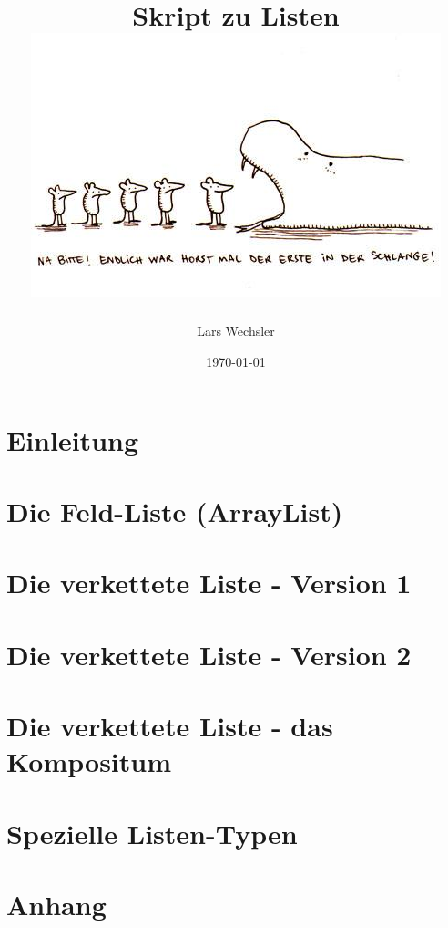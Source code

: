 \documentclass{article}
\author{Lars Wechsler}
\title{Skript zu Listen \\ \centering\includegraphics[scale=0.80]{media/title.jpg}}
\date{\today}
\begin{document}
\maketitle
\newpage 

\tableofcontents
\section{Einleitung}



\newpage

\section{Die Feld-Liste (ArrayList)}



\newpage



\newpage

\section{Die verkettete Liste - Version 1}





\newpage

\section{Die verkettete Liste - Version 2}



\newpage

\section{Die verkettete Liste - das Kompositum}





\newpage

\section{Spezielle Listen-Typen}



\newpage

\section{Anhang}


\end{document}
